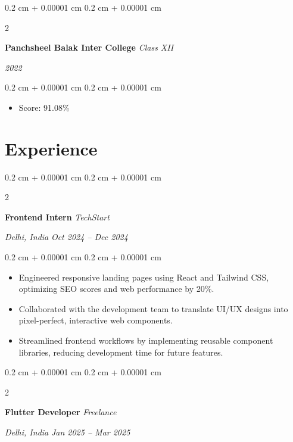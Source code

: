 \documentclass[10pt, a4paper]{article}
\newenvironment{highlights}{
    \begin{itemize}[
        topsep=0.10 cm,
        parsep=0.10 cm,
        partopsep=0pt,
        itemsep=0pt,
        leftmargin=0.4 cm + 10pt
    ]
}{
    \end{itemize}
} %
\newenvironment{onecolentry}{
    \begin{adjustwidth}{
        0.2 cm + 0.00001 cm
    }{
        0.2 cm + 0.00001 cm
    }
}{
    \end{adjustwidth}
} %
\newenvironment{twocolentry}[2][]{
    \onecolentry
    \def\secondColumn{#2}
    \setcolumnwidth{\fill, 4.5 cm}
    \begin{paracol}{2}
}{
    \switchcolumn \raggedleft \secondColumn
    \end{paracol}
    \endonecolentry
} %
\begin{document}
    \begin{twocolentry}{
        \textit{2022}
    }
    \textbf{Panchsheel Balak Inter College}
    \textit{Class XII}
    \end{twocolentry}
    \vspace{0.10 cm}
    \begin{onecolentry}
    \begin{highlights}
        \item Score: 91.08\%
    \end{highlights}
    \end{onecolentry}
    

    \section{Experience}

        \begin{twocolentry}{
            \textit{Delhi, India}    
            \textit{Oct 2024 -- Dec 2024}
        }
        \textbf{Frontend Intern}
        \textit{TechStart}
        \end{twocolentry}

        \vspace{0.10 cm}
        \begin{onecolentry}
        \begin{highlights}
            \item Engineered responsive landing pages using React and Tailwind CSS, optimizing SEO scores and web performance by 20\%.
\item Collaborated with the development team to translate UI/UX designs into pixel-perfect, interactive web components.
\item Streamlined frontend workflows by implementing reusable component libraries, reducing development time for future features.
        \end{highlights}
        \end{onecolentry}
        \vspace{0.2 cm}
        

        \begin{twocolentry}{
            \textit{Delhi, India}    
            \textit{Jan 2025 -- Mar 2025}
        }
        \textbf{Flutter Developer}
        \textit{Freelance}
        \end{twocolentry}
\end{document}
